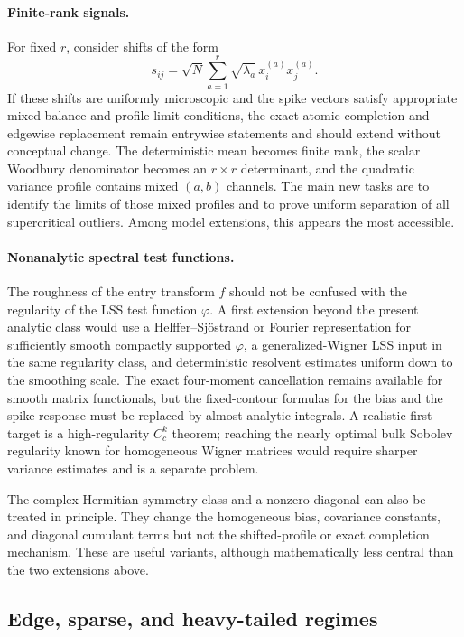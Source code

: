 \documentclass[11pt]{article}
\theoremstyle{definition}
\theoremstyle{remark}
\begin{document}
\paragraph*{Finite-rank signals.}
For fixed $r$, consider shifts of the form
\[
 s_{ij}=\sqrt N\sum_{a=1}^r\sqrt{\lambda_a}\,
 x_i^{(a)}x_j^{(a)}.
\]
If these shifts are uniformly microscopic and the spike vectors satisfy
appropriate mixed balance and profile-limit conditions, the exact atomic
completion and edgewise replacement remain entrywise statements and should
extend without conceptual change.  The deterministic mean becomes finite
rank, the scalar Woodbury denominator becomes an $r\times r$ determinant,
and the quadratic variance profile contains mixed $(a,b)$ channels.  The main
new tasks are to identify the limits of those mixed profiles and to prove
uniform separation of all supercritical outliers.  Among model extensions,
this appears the most accessible.

\paragraph*{Nonanalytic spectral test functions.}
The roughness of the entry transform $f$ should not be confused with the
regularity of the LSS test function $\varphi$.  A first extension beyond the
present analytic class would use a Helffer--Sj\"ostrand or Fourier
representation for sufficiently smooth compactly supported $\varphi$, a
generalized-Wigner LSS input in the same regularity class, and deterministic
resolvent estimates uniform down to the smoothing scale.  The exact
four-moment cancellation remains available for smooth matrix functionals,
but the fixed-contour formulas for the bias and the spike response must be
replaced by almost-analytic integrals.  A realistic first target is a
high-regularity $C_c^k$ theorem; reaching the nearly optimal bulk Sobolev
regularity known for homogeneous Wigner matrices would require sharper
variance estimates and is a separate problem.

The complex Hermitian symmetry class and a nonzero diagonal can also be
treated in principle.  They change the homogeneous bias, covariance
constants, and diagonal cumulant terms but not the shifted-profile or exact
completion mechanism.  These are useful variants, although mathematically
less central than the two extensions above.

\subsection{Edge, sparse, and heavy-tailed regimes}
\label{subsec:discussion-frontiers}
\end{document}
